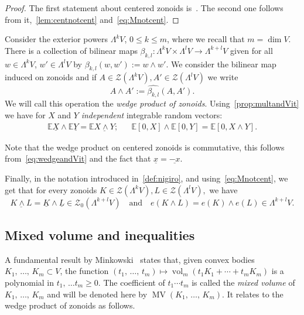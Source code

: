 \documentclass[AHL, Unicode, longabstracts, published]{cedram}
\newcommand{\EE}{\mathbb{E}}
\newcommand{\ZZ}{\mathscr{Z}}
\newcommand{\ZZo}{\mathscr{Z}_0}
\DeclareMathOperator{\vol}{vol}
\DeclareMathOperator{\MV}{MV}
\newcommand{\seg}{\underline}
\begin{document}
\begin{proof}
The first statement about centered zonoids is~\cite[Corollary~4.3]{ZA}. The second one follows from it,~\cref{lem:centnotcent} and~\eqref{eq:Mnotcent}.
\end{proof}

Consider the exterior powers $\Lambda^k V$, $0\leq k \leq m$, where we recall that $m=\dim V$. There is a collection of bilinear maps $\beta_{k,l}:\Lambda^k V\times \Lambda^l V\to \Lambda^{k+l} V$ given for all $w\in \Lambda^k V$, $w'\in\Lambda^l V$ by $\beta_{k,l}(w,w'):=w\wedge w'$. We consider the bilinear map induced on zonoids and if $A\in\ZZ(\Lambda^k V),A'\in\ZZ(\Lambda^l V)$ we write
\begin{equation*}
A\wedge A':=\widehat{\beta_{k,l}}(A,A').
\end{equation*}
We will call this operation the \emph{wedge product of zonoids}. Using~\cref{prop:multandVit} we have for $X$ and $Y$ \emph{independent} integrable random vectors:
\begin{align}\label{eq:wedgeandVit}
\EE\seg{X}\wedge\EE\seg{Y}=\EE\seg{X\wedge Y}; && \EE[0,X]\wedge \EE[0,Y]=\EE[0,X\wedge Y].
\end{align}

\begin{rema}
Note that the wedge product on centered zonoids is commutative, this follows from~\eqref{eq:wedgeandVit} and the fact that $\seg{x}=\seg{-x}$.
\end{rema}

Finally, in the notation introduced in~\cref{def:nigiro}, and using~\eqref{eq:Mnotcent}, we get that for every zonoids $K\in\ZZ(\Lambda^kV),L\in\ZZ(\Lambda^lV),$ we have
\begin{equation*}
\seg{K\wedge L}=\seg{K}\wedge\seg{L}\in \ZZo\left(\Lambda^{k+l}V\right)\quad\text{and}\quad e(K\wedge L)=e(K)\wedge e(L)\in\Lambda^{k+l}V.
\end{equation*}


\subsection{Mixed volume and inequalities}\label{sec:MV}

A fundamental result by Minkowski~\cite[Theorem~5.1.7]{bible} states that, given convex bodies $K_1,\,\ldots,\,K_m\subset V$, the function $(t_1,\,\ldots,\,t_m)\mapsto \vol_m(t_1K_1+\cdots+t_mK_m)$ is a polynomial in $t_1,\,\ldots t_m\geq0$. The coefficient of $t_1\cdots t_m$ is called the \emph{mixed volume} of $K_1,\,\ldots,\,K_m$ and will be denoted here by $\MV(K_1,\,\ldots,\,K_m).$ It relates to the wedge product of zonoids as follows.
\end{document}
